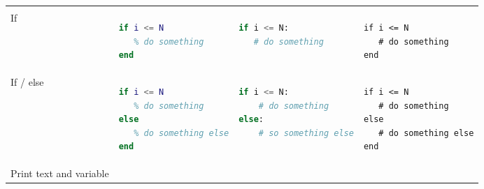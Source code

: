 \documentclass[10pt, landscape]{article}
\begin{document}
\begin{multicols}{2}
\begin{tabular}[]{@{}llll@{}}
\begin{minipage}[t]{0.25\columnwidth}
\end{minipage}\tabularnewline
\begin{minipage}[t]{0.19\columnwidth}\raggedright\strut
If\strut
\end{minipage} & \begin{minipage}[t]{0.22\columnwidth}\raggedright\strut
\begin{lstlisting}[language=Matlab]
if i <= N
   % do something
end
\end{lstlisting}
\strut
\end{minipage} & \begin{minipage}[t]{0.22\columnwidth}\raggedright\strut
\begin{lstlisting}[language=Python]
if i <= N:
   # do something
\end{lstlisting}
\strut
\end{minipage} & \begin{minipage}[t]{0.25\columnwidth}\raggedright\strut
\begin{lstlisting}
if i <= N
   # do something
end
\end{lstlisting}
\strut
\end{minipage}\tabularnewline
\begin{minipage}[t]{0.19\columnwidth}\raggedright\strut
If / else\strut
\end{minipage} & \begin{minipage}[t]{0.22\columnwidth}\raggedright\strut
\begin{lstlisting}[language=Matlab]
if i <= N
   % do something
else
   % do something else
end
\end{lstlisting}
\strut
\end{minipage} & \begin{minipage}[t]{0.22\columnwidth}\raggedright\strut
\begin{lstlisting}[language=Python]
if i <= N:
    # do something
else:
    # so something else
\end{lstlisting}
\strut
\end{minipage} & \begin{minipage}[t]{0.25\columnwidth}\raggedright\strut
\begin{lstlisting}
if i <= N
   # do something
else
   # do something else
end
\end{lstlisting}
\strut
\end{minipage}\tabularnewline
\begin{minipage}[t]{0.19\columnwidth}\raggedright\strut
Print text and variable\strut
\end{minipage} & \begin{minipage}[t]{0.22\columnwidth}\raggedright\strut

\end{minipage}
\end{tabular}
\end{multicols}
\end{document}
